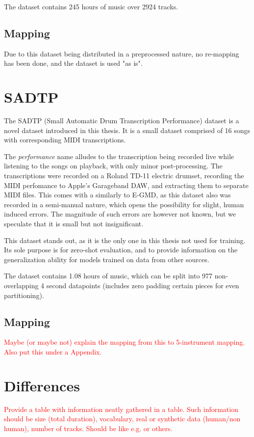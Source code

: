 The dataset contains 245 hours of music over 2924 tracks.

\subsection{Mapping}

Due to this dataset being distributed in a preprocessed nature, no re-mapping has been done, and the dataset is used "as is".

\section{SADTP}

The SADTP (Small Automatic Drum Transcription Performance) dataset is a novel dataset introduced in this thesis. It is a small dataset comprised of 16 songs with corresponding MIDI transcriptions. 

The \textit{performance} name alludes to the transcription being recorded live while listening to the songs on playback, with only minor post-processing. The transcriptions were recorded on a Roland TD-11 electric drumset, recording the MIDI perfomance to Apple's Garageband \gls{DAW}, and extracting them to separate MIDI files. This comes with a similarly to E-GMD, as this dataset also was recorded in a semi-manual nature, which opens the possibility for slight, human induced errors. The magnitude of such errors are however not known, but we speculate that it is small but not insignificant.

This dataset stands out, as it is the only one in this thesis not used for training. Its sole purpose is for zero-shot evaluation, and to provide information on the generalization ability for models trained on data from other sources.

The dataset contains 1.08 hours of music, which can be split into 977 non-overlapping 4 second datapoints (includes zero padding certain pieces for even partitioning).

\subsection{Mapping}

\textcolor{red}{Maybe (or maybe not) explain the mapping from this to 5-instrument mapping. Also put this under a Appendix.}

\section{Differences}

\textcolor{red}{Provide a table with information neatly gathered in a table. Such information should be size (total duration), vocabulary, real or synthetic data (human/non human), number of tracks. Should be like e.g. \cite{signals4040042,callender2020improvingperceptualqualitydrum} or others.}